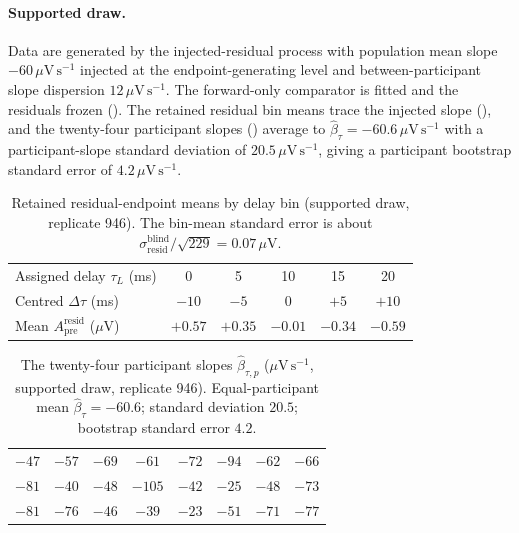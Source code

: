 \documentclass[11pt,a4paper]{article}
\theoremstyle{definition}
\newcommand{\Apre}{A_{\mathrm{pre}}}
\newcommand{\tauL}{\tau_L}
\begin{document}
\paragraph{Supported draw.} Data are generated by the injected-residual process
with population mean slope \(-60\,\mu\mathrm{V\,s^{-1}}\) injected at the
endpoint-generating level and between-participant slope dispersion
\(12\,\mu\mathrm{V\,s^{-1}}\). The forward-only comparator is fitted and the
residuals frozen (). The retained residual bin means trace
the injected slope (), and the twenty-four participant
slopes () average to
\(\widehat{\beta}_\tau=-60.6\,\mu\mathrm{V\,s^{-1}}\) with a participant-slope
standard deviation of \(20.5\,\mu\mathrm{V\,s^{-1}}\), giving a participant
bootstrap standard error of \(4.2\,\mu\mathrm{V\,s^{-1}}\).

\begin{table}[t]
\centering
\caption{Retained residual-endpoint means by delay bin (supported draw, replicate
946). The bin-mean standard error is about
\(\sigma_{\mathrm{resid}}^{\mathrm{blind}}/\sqrt{229}=0.07\,\mu\mathrm{V}\).}
\label{tab:si-worked-bins}
\footnotesize
\begin{tabular}{lccccc}
\toprule
Assigned delay \(\tauL\) (ms) & 0 & 5 & 10 & 15 & 20 \\
Centred \(\Delta\tau\) (ms) & \(-10\) & \(-5\) & \(0\) & \(+5\) & \(+10\) \\
Mean \(\Apre^{\mathrm{resid}}\) (\(\mu\mathrm{V}\)) &
\(+0.57\) & \(+0.35\) & \(-0.01\) & \(-0.34\) & \(-0.59\) \\
\bottomrule
\end{tabular}
\end{table}

\begin{table}[t]
\centering
\caption{The twenty-four participant slopes \(\widehat{\beta}_{\tau,p}\)
(\(\mu\mathrm{V\,s^{-1}}\), supported draw, replicate 946). Equal-participant mean
\(\widehat{\beta}_\tau=-60.6\); standard deviation \(20.5\); bootstrap standard
error \(4.2\).}
\label{tab:si-worked-slopes}
\footnotesize
\begin{tabular}{cccccccc}
\toprule
\(-47\) & \(-57\) & \(-69\) & \(-61\) & \(-72\) & \(-94\) & \(-62\) & \(-66\) \\
\(-81\) & \(-40\) & \(-48\) & \(-105\) & \(-42\) & \(-25\) & \(-48\) & \(-73\) \\
\(-81\) & \(-76\) & \(-46\) & \(-39\) & \(-23\) & \(-51\) & \(-71\) & \(-77\) \\
\bottomrule
\end{tabular}
\end{table}
\end{document}
